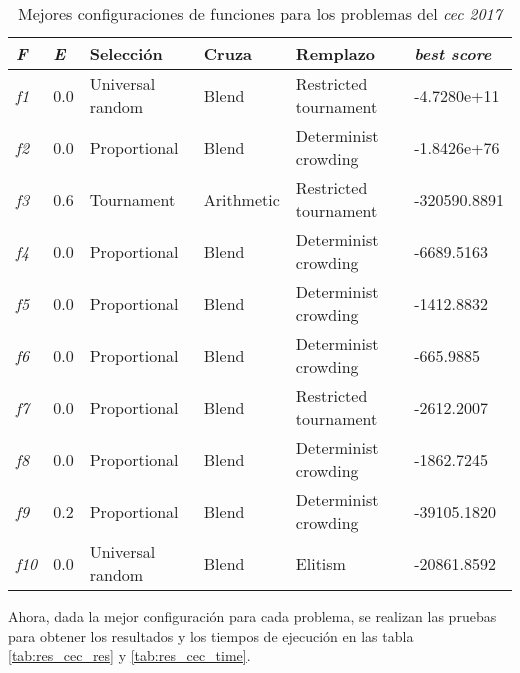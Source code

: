 \begin{table}[H]
	\centering
	\begin{tabular}{|p{}| p{}| p{} |p{}|p{}| p{} |}
		\hline
	 \textbf{\textit{F}}	& \textbf{\textit{E}} & \textbf{Selección} & \textbf{Cruza} & \textbf{Remplazo} & \textbf{\textit{best score}}\\ \hline
		\textit{f1} & 0.0 & Universal random & Blend & Restricted tournament & -4.7280e+11 \\ 
		\textit{f2} & 0.0 & Proportional & Blend & Determinist crowding  & -1.8426e+76 \\ 
		\textit{f3} & 0.6 & Tournament & Arithmetic & Restricted tournament & -320590.8891 \\ 
		\textit{f4} & 0.0 & Proportional & Blend & Determinist crowding & -6689.5163 \\ 
		\textit{f5} & 0.0 & Proportional & Blend & Determinist crowding & -1412.8832 \\ 
		\textit{f6} & 0.0 & Proportional & Blend & Determinist crowding & -665.9885 \\ 
		\textit{f7} & 0.0 & Proportional & Blend & Restricted tournament & -2612.2007 \\ 
		\textit{f8} & 0.0 & Proportional & Blend & Determinist crowding & -1862.7245 \\ 
		\textit{f9} & 0.2 & Proportional & Blend & Determinist crowding & -39105.1820 \\ 
		\textit{f10} & 0.0 & Universal random  & Blend & Elitism & -20861.8592 \\ \hline
	\end{tabular}
	\caption{Mejores configuraciones de funciones para los problemas del \textit{cec 2017}}
	\label{tab:res_cec}
\end{table}


Ahora, dada la mejor configuración para cada problema, se realizan las pruebas para obtener los resultados y los tiempos de ejecución en las tabla \ref{tab:res_cec_res} y \ref{tab:res_cec_time}.


